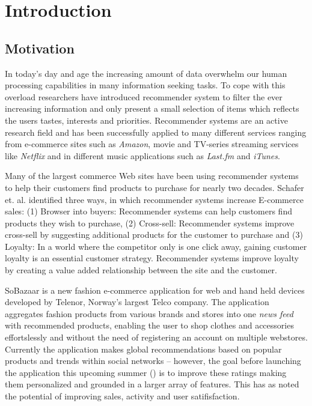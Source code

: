 
\chapter{Introduction}
\label{chap:introduction}
\minitoc
\setcounter{page}{1}
\clearpage

\section{Motivation}
\label{sec:motivation}

In today's day and age the increasing amount of data overwhelm our human
processing capabilities in many information seeking tasks. To cope with this
overload researchers have introduced recommender system to filter the ever
increasing information and only present a small selection of items which
reflects the users tastes, interests and priorities. Recommender systems are an
active research field and has been successfully applied to many different
services ranging from e-commerce sites such as \emph{Amazon}, movie and
TV-series streaming services like \emph{Netflix} and in different music
applications such as \emph{Last.fm} and \emph{iTunes}.

Many of the largest commerce Web sites have been using recommender systems to
help their customers find products to purchase for nearly two decades.
Schafer et. al. \cite{Schafer1999} identified three ways, in which recommender
systems increase E-commerce sales: (1) Browser into buyers: Recommender systems
can help customers find products they wish to purchase, (2) Cross-sell:
Recommender systems improve cross-sell by suggesting additional products for
the customer to purchase and (3) Loyalty: In a world where the competitor only
is one click away, gaining customer loyalty is an essential customer strategy.
Recommender systems improve loyalty by creating a value added relationship
between the site and the customer.

SoBazaar is a new fashion e-commerce application for web and hand held devices
developed by Telenor, Norway's largest Telco company. The application
aggregates fashion products from various brands and stores into one \emph{news
feed} with recommended products, enabling the user to shop clothes and
accessories effortslessly and without the need of registering an account on
multiple webstores. Currently the application makes global recommendations
based on popular products and trends within social networks – however, the goal
before launching the application this upcoming summer (\the\year) is to improve
these ratings making them personalized and grounded in a larger array of
features. This has as noted the potential of improving sales, activity and user
satifisfaction.

